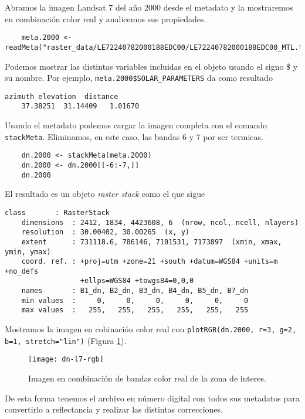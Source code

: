 \begin{exa}
    Abramos  la imagen Landsat 7
    del año 2000 desde el metadato y la mostraremos en combinaci\'on color real
    y analicemos sus propiedades.
    \begin{lstlisting}
    meta.2000 <- readMeta("raster_data/LE72240782000188EDC00/LE72240782000188EDC00_MTL.txt")
    \end{lstlisting}
    Podemos mostrar las distintas variables incluidas en el objeto usando el
    signo \$ y su nombre. Por ejemplo, \verb|meta.2000$SOLAR_PARAMETERS|
    da como resultado
    \begin{Verbatim}[fontsize=\small]
     azimuth elevation  distance
    37.38251  31.14409   1.01670
    \end{Verbatim}
    Usando el metadato podemos cargar la imagen completa con el comando
    \texttt{stackMeta}. Eliminamos, en este caso, las bandas 6 y 7 por
    ser termicas.
    \begin{lstlisting}
    dn.2000 <- stackMeta(meta.2000)
    dn.2000 <- dn.2000[[-6:-7,]]
    dn.2000
    \end{lstlisting}
    El resultado es un objeto \emph{raster stack} como el que sigue
    \begin{Verbatim}[fontsize=\small]
    class       : RasterStack
    dimensions  : 2412, 1834, 4423608, 6  (nrow, ncol, ncell, nlayers)
    resolution  : 30.00402, 30.00265  (x, y)
    extent      : 731118.6, 786146, 7101531, 7173897  (xmin, xmax, ymin, ymax)
    coord. ref. : +proj=utm +zone=21 +south +datum=WGS84 +units=m +no_defs
                  +ellps=WGS84 +towgs84=0,0,0
    names       : B1_dn, B2_dn, B3_dn, B4_dn, B5_dn, B7_dn
    min values  :     0,     0,     0,     0,     0,     0
    max values  :   255,   255,   255,   255,   255,   255
    \end{Verbatim}
    Mostramos la imagen en cobinaci\'on color real con \texttt{plotRGB(dn.2000, r=3, g=2, b=1, stretch="lin")}
    (Figura \ref{fig:dn-l7-rgb}).
     \begin{figure}[h!]
     \begin{center}
         \texttt{[image: dn-l7-rgb]}
     \end{center}
     \caption{Imagen en combinaci\'on de bandas color real de la zona de interes.}
     \label{fig:dn-l7-rgb}
     \end{figure}
\end{exa}

De esta forma tenemos el archivo en n\'umero digital con todos sus metadatos
para convertirlo a reflectancia y realizar las distintas correcciones.

